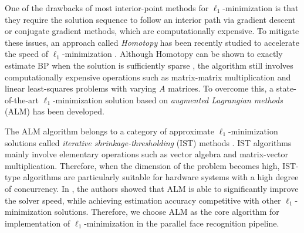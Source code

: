 One of the drawbacks of most interior-point methods for $\ell_1$-minimization
is that they require the solution sequence to follow an interior path via
gradient descent or conjugate gradient methods, which are computationally
expensive.  To mitigate these issues, an approach called \emph{Homotopy} has
been recently studied to accelerate the speed of $\ell_1$-minimization
\cite{OsborneM2000,EfronB2004,MalioutovD2005,DonohoD2006}.  Although Homotopy
can be shown to exactly estimate BP when the solution is sufficiently sparse
\cite{DonohoD2006}, the algorithm still involves computationally expensive
operations such as matrix-matrix multiplication and linear least-squares
problems with varying $A$ matrices.  To overcome this, a state-of-the-art
$\ell_1$-minimization solution based on \emph{augmented Lagrangian methods}
(ALM) \cite{BertsekasD2003,YangA2010-ICIP} has been developed.

The ALM algorithm belongs to a
category of approximate $\ell_1$-minimization solutions called \emph{iterative
shrinkage-thresholding} (IST) methods \cite{WrightS2008,BeckA2009}.  IST
algorithms mainly involve elementary operations such as vector algebra and
matrix-vector multiplication. Therefore, when the dimension of the problem
becomes high, IST-type algorithms are particularly suitable for hardware
systems with a high degree of concurrency. In \cite{YangA2010-ICIP}, the
authors showed that ALM is able to significantly improve the solver speed,
while achieving estimation accuracy competitive with other $\ell_1$-minimization
solutions. Therefore, we choose ALM as the core algorithm for
implementation of $\ell_1$-minimization in the parallel face recognition pipeline.





